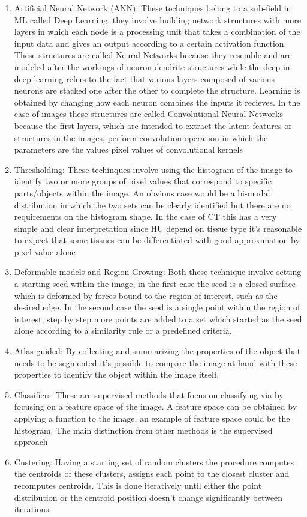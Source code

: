 \begin{enumerate}
\item Artificial Neural Network (ANN): These techniques belong to a sub-field in ML called Deep Learning, they involve building network structures with more layers in which each node is a processing unit that takes a combination of the input data and gives an output according to a certain activation function. These structures are called Neural Networks because they resemble and are modeled after the workings of neuron-dendrite structures while the deep in deep learning refers to the fact that various layers composed of various neurons are stacked one after the other to complete the structure. Learning is obtained by changing how each neuron combines the inputs it recieves. In the case of images these structures are called Convolutional Neural Networks because the first layers, which are intended to extract the latent features or structures in the images, perform convolution operation in which the parameters are the values pixel values of convolutional kernels 
\item Thresholding: These techinques involve using the histogram of the image to identify two or more groups of pixel values that correspond to specific parts/objects within the image. An obvious case would be a bi-modal distribution in which the two sets can be clearly identified but there are no requirements on the histogram shape.  In the case of CT this has a very simple and clear interpretation since HU depend on tissue type it's reasonable to expect that some tissues can be differentiated with good approximation by pixel value alone
\item Deformable models and Region Growing: Both these technique involve setting a starting seed within the image, in the first case the seed is a closed surface which is deformed by forces bound to the region of interest, such as the desired edge. In the second case the seed is a single point within the region of interest, step by step more points are added to a set which started as the seed alone according to a similarity rule  or a predefined criteria. 
\item Atlas-guided: By collecting and summarizing the properties of the object that needs to be segmented it's possible to compare the image at hand with these properties to identify the object within the image itself.
\item Classifiers: These are supervised methods that focus on classifying via by focusing on a feature space of the image. A feature space can be obtained by applying a function to the image, an example of feature space could be the histogram. The main distinction from other methods is the supervised approach
\item Custering: Having a starting set of random clusters the procedure computes the centroids of these clusters, assigns each point to the closest cluster and recomputes centroids. This is done iteratively until either the point distribution or the centroid position doesn't change significantly between iterations.
\end{enumerate} 

